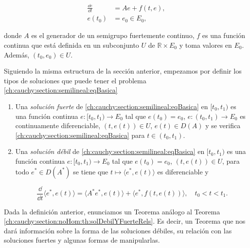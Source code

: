 \begin{equation}
    \label{ch:cauchy:section:semilineal:eqBasica}
    \begin{aligned}
        \frac{\dd e}{\dd t} &= Ae + f(t,e),\\
        e(t_0) &= e_0 \in E_0,
    \end{aligned}
\end{equation}

donde $A$ es el generador de un semigrupo fuertemente continuo, $f$ es una función continua que está definida en un subconjunto $U$ de $\mathbb{R} \times E_0$ y toma valores en $E_0$. Además, $(t_0, e_0) \in U$.

Siguiendo la misma estructura de la sección anterior, empezamos por definir los tipos de soluciones que puede tener el problema \eqref{ch:cauchy:section:semilineal:eqBasica}\\

\begin{Definicion}
    \label{ch:cauchy:section:semilineal:def:soluciones}

    \begin{enumerate}[label=\alph*)]
        \item Una \textit{solución fuerte} de \eqref{ch:cauchy:section:semilineal:eqBasica} en $[t_0, t_1)$ es una función continua $e : [t_0, t_1) \rightarrow E_0$ tal que $e(t_0) = e_0$, $e : (t_0, t_1) \rightarrow E_0$ es continuamente diferenciable, $(t, e(t)) \in U$, $e(t) \in D(A)$ y se verifica \eqref{ch:cauchy:section:semilineal:eqBasica} para $t \in (t_0, t_1)$. 

        \item Una \textit{solución débil} de \eqref{ch:cauchy:section:semilineal:eqBasica} en $[t_0, t_1)$ es una función continua $e : [t_0, t_1) \rightarrow E_0$ tal que $e(t_0) = e_0$, $(t, e(t)) \in U$, para todo $e^* \in D(A^*)$ se tiene que $t \mapsto \langle e^*, e(t) \rangle$ es diferenciable y 

        \[\frac{\dd}{\dd t}\langle e^*, e(t) \rangle = \langle A^* e^*, e(t) \rangle + \langle e^*, f(t, e(t)) \rangle, \quad t_0 < t < t_1.\]
    \end{enumerate}
\end{Definicion}

Dada la definición anterior, enunciamos un Teorema análogo al Teorema \ref{ch:cauchy:section:noHom:th:solDebilYFuerteRels}. Es decir, un Teorema que nos dará información sobre la forma de las soluciones débiles, su relación con las soluciones fuertes y algunas formas de manipularlas.\\

